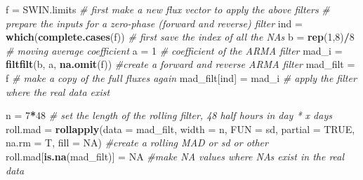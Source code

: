 \documentclass[
]{article}
\newenvironment{Shaded}{\begin{snugshade}}{\end{snugshade}}
\newcommand{\AttributeTok}[1]{\textcolor[rgb]{0.13,0.29,0.53}{#1}}
\newcommand{\CommentTok}[1]{\textcolor[rgb]{0.56,0.35,0.01}{\textit{#1}}}
\newcommand{\ConstantTok}[1]{\textcolor[rgb]{0.56,0.35,0.01}{#1}}
\newcommand{\DecValTok}[1]{\textcolor[rgb]{0.00,0.00,0.81}{#1}}
\newcommand{\FunctionTok}[1]{\textcolor[rgb]{0.13,0.29,0.53}{\textbf{#1}}}
\newcommand{\NormalTok}[1]{#1}
\newcommand{\OtherTok}[1]{\textcolor[rgb]{0.56,0.35,0.01}{#1}}
\newcommand{\SpecialCharTok}[1]{\textcolor[rgb]{0.81,0.36,0.00}{\textbf{#1}}}
\begin{document}
\begin{Shaded}
\begin{Highlighting}[]
\NormalTok{f }\OtherTok{=}\NormalTok{ SWIN.limits }\CommentTok{\# first make a new flux vector to apply the above filters}
\CommentTok{\# prepare the inputs for a zero{-}phase (forward and reverse) filter  }
\NormalTok{ind       }\OtherTok{=} \FunctionTok{which}\NormalTok{(}\FunctionTok{complete.cases}\NormalTok{(f))   }\CommentTok{\# first save the index of all the NAs}
\NormalTok{b         }\OtherTok{=} \FunctionTok{rep}\NormalTok{(}\DecValTok{1}\NormalTok{,}\DecValTok{8}\NormalTok{)}\SpecialCharTok{/}\DecValTok{8}                 \CommentTok{\# moving average coefficient}
\NormalTok{a         }\OtherTok{=} \DecValTok{1}                          \CommentTok{\# coefficient of the ARMA filter}
\NormalTok{mad\_i    }\OtherTok{=} \FunctionTok{filtfilt}\NormalTok{(b, a, }\FunctionTok{na.omit}\NormalTok{(f)) }\CommentTok{\#create a forward and reverse ARMA filter}
\NormalTok{mad\_filt }\OtherTok{=}\NormalTok{ f                          }\CommentTok{\# make a copy of the full fluxes again}
\NormalTok{mad\_filt[ind] }\OtherTok{=}\NormalTok{ mad\_i                }\CommentTok{\# apply the filter where the real data exist}

\NormalTok{n }\OtherTok{=} \DecValTok{7}\SpecialCharTok{*}\DecValTok{48} \CommentTok{\# set the length of the rolling filter, 48 half hours in day * x days}
\NormalTok{roll.mad }\OtherTok{=} \FunctionTok{rollapply}\NormalTok{(}\AttributeTok{data =}\NormalTok{ mad\_filt,}
                     \AttributeTok{width =}\NormalTok{ n,}
                     \AttributeTok{FUN =}\NormalTok{ sd,}
                     \AttributeTok{partial =} \ConstantTok{TRUE}\NormalTok{,}
                     \AttributeTok{na.rm =}\NormalTok{ T,}
                     \AttributeTok{fill =} \ConstantTok{NA}\NormalTok{)  }\CommentTok{\#create a rolling MAD or sd or other}
\NormalTok{roll.mad[}\FunctionTok{is.na}\NormalTok{(mad\_filt)] }\OtherTok{=} \ConstantTok{NA}  \CommentTok{\#make NA values where NAs exist in the real data}


\end{Highlighting}
\end{Shaded}
\end{document}
